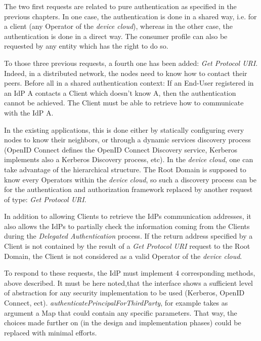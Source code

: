 The two first requests are related to pure authentication as specified in the previous chapters. In one case, the authentication is done in a shared way, i.e. for a client (any Operator of the \emph{device cloud}), whereas in the other case, the authentication is done in a direct way. The consumer profile can also be requested by any entity which has the right to do so.

To those three previous requests, a fourth one has been added: \textit{Get Protocol URI}. Indeed, in a distributed network, the nodes need to know how to contact their peers. Before all in a shared authentication context: If an End-User registered in an IdP A contacts a Client which doesn't know A, then the authentication cannot be achieved. The Client must be able to retrieve how to communicate with the IdP A.

In the existing applications, this is done either by statically configuring every nodes to know their neighbors, or through a dynamic services discovery process (OpenID Connect defines the OpenID Connect Discovery service, Kerberos implements also a Kerberos Discovery process, etc). In the \emph{device cloud}, one can take advantage of the hierarchical structure. The Root Domain is supposed to know every Operators within the \emph{device cloud}, so such a discovery process can be for the authentication and authorization framework replaced by another request of type: \textit{Get Protocol URI}.

In addition to allowing Clients to retrieve the IdPs communication addresses, it also allows the IdPs to partially check the information coming from the Clients during the \textit{Delegated Authentication} process. If the return address specified by a Client is not contained by the result of a \textit{Get Protocol URI} request to the Root Domain, the Client is not considered as a valid Operator of the \emph{device cloud}.

\vspace{2em}

To respond to these requests, the IdP must implement 4 corresponding methods, above described. It must be here noted,that the interface shows a sufficient level of abstraction for any security implementation to be used (Kerberos, OpenID Connect, ect). \textit{authenticatePrincipalForThirdParty}, for example takes as argument a Map that could contain any specific parameters. That way, the choices made further on (in the design and implementation phases) could be replaced with minimal efforts. 

